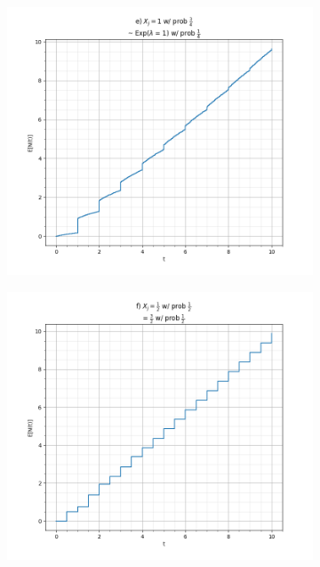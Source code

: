\documentclass[a4paper]{article}
\begin{document}
\begin{itemize}
\begin{figure} [t]
\begin{subfigure}[b]{0.45\textwidth}
                \includegraphics[width=1\linewidth]{src/e.png}
            \end{subfigure}
            \begin{subfigure}[b]{0.45\textwidth}
                \includegraphics[width=1\linewidth]{src/f.png}
            \end{subfigure}
            \\
            \begin{subfigure}[b]{0.45\textwidth}

\end{subfigure}
\end{figure}
\end{itemize}
\end{document}
